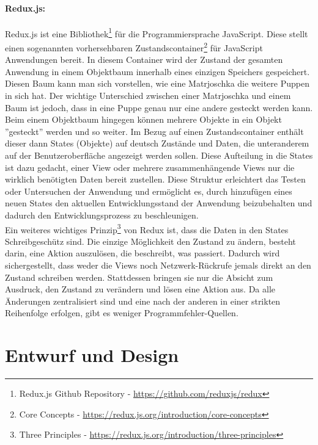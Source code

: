 \documentclass[nomenclature, oneside, 150]{HSMW-Thesis}
\begin{document}
		\paragraph{Redux.js:}
			Redux.js ist eine Bibliothek\footnote{Redux.js Github Repository - \href{https://github.com/reduxjs/redux}{\url{https://github.com/reduxjs/redux}}} für die Programmiersprache JavaScript. Diese stellt einen sogenannten vorhersehbaren Zustandscontainer\footnote{Core Concepts - \href{https://redux.js.org/introduction/core-concepts}{\url{https://redux.js.org/introduction/core-concepts}}} für JavaScript Anwendungen bereit. In diesem Container wird der Zustand der gesamten Anwendung in einem Objektbaum innerhalb eines einzigen Speichers gespeichert. Diesen Baum kann man sich vorstellen, wie eine Matrjoschka die weitere Puppen in sich hat. Der wichtige Unterschied zwischen einer Matrjoschka und einem Baum ist jedoch, dass in eine Puppe genau nur eine andere gesteckt werden kann. Beim einem Objektbaum hingegen können mehrere Objekte in ein Objekt ''gesteckt'' werden und so weiter. Im Bezug auf einen Zustandscontainer enthält dieser dann States (Objekte) auf deutsch Zustände und Daten, die unteranderem auf der Benutzeroberfläche angezeigt werden sollen. Diese Aufteilung in die States ist dazu gedacht, einer View oder mehrere zusammenhängende Views nur die wirklich benötigten Daten bereit zustellen. Diese Struktur erleichtert das Testen oder Untersuchen der Anwendung und ermöglicht es, durch hinzufügen eines neuen States den aktuellen Entwicklungsstand der Anwendung beizubehalten und dadurch den Entwicklungsprozess zu beschleunigen. \\
			Ein weiteres wichtiges Prinzip\footnote{Three Principles - \href{https://redux.js.org/introduction/three-principles}{\url{https://redux.js.org/introduction/three-principles}}} von Redux ist, dass die Daten in den States Schreibgeschütz sind. Die einzige Möglichkeit den Zustand zu ändern, besteht darin, eine Aktion auszulösen, die beschreibt, was passiert. Dadurch wird sichergestellt, dass weder die Views noch Netzwerk-Rückrufe jemals direkt an den Zustand schreiben werden. Stattdessen bringen sie nur die Absicht zum Ausdruck, den Zustand zu verändern und lösen eine Aktion aus. Da alle Änderungen zentralisiert sind und eine nach der anderen in einer strikten Reihenfolge erfolgen, gibt es weniger Programmfehler-Quellen.

	\section{Entwurf und Design}
\end{document}

